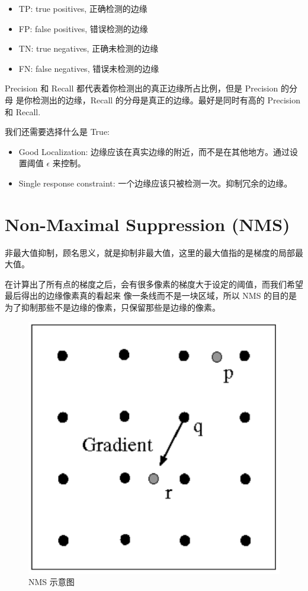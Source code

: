 \begin{itemize}
    \item TP: true positives, 正确检测的边缘
    \item FP: false positives, 错误检测的边缘
    \item TN: true negatives, 正确未检测的边缘
    \item FN: false negatives, 错误未检测的边缘
\end{itemize}

Precision 和 Recall 都代表着你检测出的真正边缘所占比例，但是 Precision 的分母
是你检测出的边缘，Recall 的分母是真正的边缘。最好是同时有高的 Precision 和 Recall.

\vspace{1em}

我们还需要选择什么是 True:

\begin{itemize}
    \item Good Localization: 边缘应该在真实边缘的附近，而不是在其他地方。通过设置阈值 $\epsilon$ 来控制。
    \item Single response constraint: 一个边缘应该只被检测一次。抑制冗余的边缘。
\end{itemize}

\section{Non-Maximal Suppression (NMS)}

非最大值抑制，顾名思义，就是抑制非最大值，这里的最大值指的是梯度的局部最大值。

在计算出了所有点的梯度之后，会有很多像素的梯度大于设定的阈值，而我们希望最后得出的边缘像素真的看起来
像一条线而不是一块区域，所以 NMS 的目的是为了抑制那些不是边缘的像素，只保留那些是边缘的像素。

\begin{figure}[htbp]
    \centering
	\includegraphics[scale=0.2]{figures/NMS.png}
	\caption{NMS 示意图}
\end{figure}


